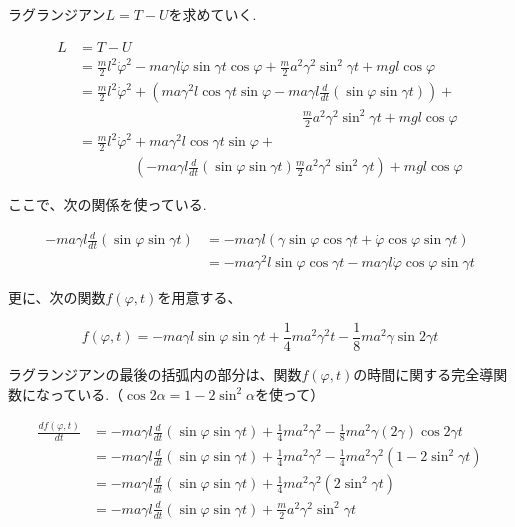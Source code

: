 ラグランジアン$ L=T-U $を求めていく.

\begin{align*}
   L &= T-U\\&=\frac{m}{2}l^2\dot{\varphi}^2 -ma\gamma l\dot{\varphi}\sin\gamma t\cos\varphi + \frac{m}{2}a^2\gamma^2\sin^2\gamma t + mgl\cos\varphi\\
   &= \frac{m}{2}l^2\dot{\varphi}^2 + \left(ma\gamma^2l \cos\gamma t\sin\varphi -ma\gamma l\frac{d}{dt}(\sin\varphi\sin\gamma t) \right) +\\
   &\qquad\qquad\qquad\qquad\qquad\qquad\qquad\qquad\frac{m}{2}a^2\gamma^2\sin^2\gamma t + mgl\cos\varphi\\
   &= \frac{m}{2}l^2\dot{\varphi}^2 +ma\gamma^2l \cos\gamma t\sin\varphi +\\&\qquad\qquad\left(-ma\gamma l\frac{d}{dt}(\sin\varphi\sin\gamma t)\frac{m}{2}a^2\gamma^2\sin^2\gamma t\right) +  mgl\cos\varphi
\end{align*}

ここで、次の関係を使っている.

\begin{align*}
   -ma\gamma l\frac{d}{dt}\left(\sin\varphi\sin\gamma t\right)&= -ma\gamma l\left(\gamma\sin\varphi\cos\gamma t +\dot{\varphi}\cos\varphi\sin\gamma t\right)\\
   &= -ma\gamma^2 l\sin\varphi\cos\gamma t - ma\gamma l\dot{\varphi}\cos\varphi\sin\gamma t
\end{align*}

更に、次の関数$f(\varphi,t)$を用意する、

\[f(\varphi,t) = -ma\gamma l\sin\varphi\sin\gamma t + \displaystyle\frac{1}{4}ma^2\gamma^2 t - \frac{1}{8}ma^2\gamma\sin 2\gamma t\]

ラグランジアンの最後の括弧内の部分は、関数$f(\varphi,t)$の時間に関する完全導関数になっている.（$\cos 2\alpha=1-2\sin^2\alpha$を使って）

\begin{align*}
   \frac{df(\varphi,t)}{dt} &= -ma\gamma l\frac{d}{dt}(\sin\varphi\sin\gamma t) + \frac{1}{4}ma^2\gamma^2 - \frac{1}{8}ma^2\gamma(2\gamma)\cos 2\gamma t\\
   &= -ma\gamma l\frac{d}{dt}(\sin\varphi\sin\gamma t) + \frac{1}{4}ma^2\gamma^2 - \frac{1}{4}ma^2\gamma^2(1-2\sin^2\gamma t)\\&= -ma\gamma l\frac{d}{dt}(\sin\varphi\sin\gamma t) + \frac{1}{4}ma^2\gamma^2(2\sin^2\gamma t)\\
   &= -ma\gamma l\frac{d}{dt}(\sin\varphi\sin\gamma t) + \frac{m}{2}a^2\gamma^2\sin^2\gamma t
\end{align*}

